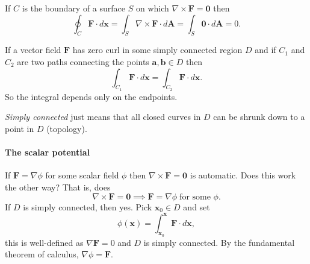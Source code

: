 If $C$ is the boundary of a surface $S$ on which 
$\nabla \times \bm F = \bm 0$
then
\[
    \oint_C \bm F \cdot d\bm x 
    = \int_S \nabla \times \bm F \cdot d\bm A 
    = \int_S \bm 0 \cdot d\bm A 
    = 0.
\]

If a vector field $\bm F$ has zero curl in some simply connected region $D$
and if $C_1$ and $C_2$ are two paths connecting the points $\bm a, \bm b \in D$
then
\[
    \int_{C_1} \bm F \cdot d\bm x = \int_{C_2} \bm F \cdot d\bm x.
\]
So the integral depends only on the endpoints.

\begin{remark}
    \emph{Simply connected} just means that all closed curves in $D$ 
    can be shrunk down to a point in $D$ (topology).
\end{remark}

\paragraph{The scalar potential}

If $\bm F = \nabla \phi$ for some scalar field $\phi$ then
$\nabla \times \bm F = \bm 0$ is automatic.
Does this work the other way? That is, does
\[
    \nabla \times \bm F = \bm 0 \implies \bm F = \nabla \phi \;\text{for some $\phi$}.
\]
If $D$ is simply connected, then yes.
Pick $\bm x_0 \in D$ and set
\[
    \phi(\bm x) = \int_{\bm x_0}^{\bm x} \bm F \cdot d\bm x,
\]
this is well-defined as 
$\nabla \bm F = 0$
and $D$ is simply connected.
By the fundamental theorem of calculus, $\nabla \phi = \bm F$.
